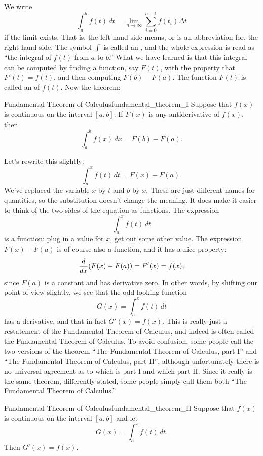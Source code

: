 We write
$$
  \int_a^b f(t)\,dt = \lim_{n\to\infty}\sum_{i=0}^{n-1} f(t_i)\Delta t
$$ 
if the limit exists. That is, the left hand side means, or is an
abbreviation for, the right hand side. The symbol $\int$ is called an
, and the whole
expression is read as ``the integral of $f(t)$ from $a$ to $b$.'' What
we have learned is that this integral can be computed by finding a
function, say $F(t)$, with the property that $F'(t)=f(t)$, and then
computing $F(b)-F(a)$. The function $F(t)$ is called an  of $f(t)$. 
Now the theorem:

\begin{theorem}{Fundamental Theorem of Calculus}{fundamental_theorem_I}
Suppose that $f(x)$ is
continuous on the interval $[a,b]$. If $F(x)$ is any antiderivative of
$f(x)$, then 
$$
  \int_a^b f(x)\,dx = F(b)-F(a).
$$
\end{theorem}

Let's rewrite this slightly: 
$$
  \int_a^x f(t)\,dt = F(x)-F(a).
$$
We've replaced the variable $x$ by $t$ and $b$ by $x$. These are just
different names for quantities, so the substitution doesn't change the
meaning. It does make it easier to think of the two sides of the
equation as functions. The expression
$$
  \int_a^x f(t)\,dt
$$
is a function: plug in a value for $x$, get out some other value. The
expression $F(x)-F(a)$ is of course also a function, and it has a nice
property: 
$$
  {d\over dx} (F(x)-F(a)) = F'(x) = f(x),
$$
since $F(a)$ is a constant and has derivative zero. In other words, by
shifting our point of view slightly, we see that the odd looking
function
$$
  G(x)=\int_a^x f(t)\,dt
$$
has a derivative, and that in fact $G'(x)=f(x)$. This is really just a
restatement of the Fundamental Theorem of Calculus, and indeed is
often called the Fundamental Theorem of Calculus. To avoid confusion,
some people call the two versions of the theorem ``The Fundamental
Theorem of Calculus, part I'' and ``The Fundamental
Theorem of Calculus, part II'', although unfortunately there is no
universal agreement as to which is part I and which part II. Since it
really is the same theorem, differently stated, some people simply
call them both ``The Fundamental
Theorem of Calculus.''

\begin{theorem}{Fundamental Theorem of Calculus}{fundamental_theorem_II}
Suppose that $f(x)$ is
continuous on the interval $[a,b]$ and let
$$
  G(x)=\int_a^x f(t)\,dt.
$$
Then $G'(x)=f(x)$.
\end{theorem}

